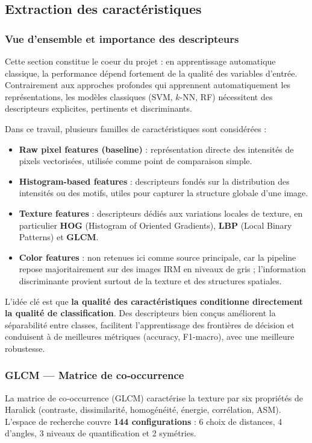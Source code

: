 \documentclass[12pt,a4paper]{article}
\newcommand{\brun}[1]{\textcolor{BlueNum}{\textbf{#1}}} %
\begin{document}
        \subsection{Extraction des caractéristiques}

        \subsubsection{Vue d'ensemble et importance des descripteurs}
            Cette section constitue le coeur du projet : en apprentissage automatique classique, la performance dépend fortement de la qualité des variables d'entrée.
            Contrairement aux approches profondes qui apprennent automatiquement les représentations, les modèles classiques (SVM, \(k\)-NN, RF) nécessitent des descripteurs explicites, pertinents et discriminants.

            Dans ce travail, plusieurs familles de caractéristiques sont considérées :
            \begin{itemize}
            \item \textbf{Raw pixel features (baseline)} : représentation directe des intensités de pixels vectorisées, utilisée comme point de comparaison simple.
            \item \textbf{Histogram-based features} : descripteurs fondés sur la distribution des intensités ou des motifs, utiles pour capturer la structure globale d'une image.
            \item \textbf{Texture features} : descripteurs dédiés aux variations locales de texture, en particulier \textbf{HOG} (Histogram of Oriented Gradients), \textbf{LBP} (Local Binary Patterns) et \textbf{GLCM}.
            \item \textbf{Color features} : non retenues ici comme source principale, car la pipeline repose majoritairement sur des images IRM en niveaux de gris ; l'information discriminante provient surtout de la texture et des structures spatiales.
            \end{itemize}

            L'idée clé est que \textbf{la qualité des caractéristiques conditionne directement la qualité de classification}.
            Des descripteurs bien conçus améliorent la séparabilité entre classes, facilitent l'apprentissage des frontières de décision et conduisent à de meilleures métriques (accuracy, F1-macro), avec une meilleure robustesse.



            \subsubsection{GLCM — Matrice de co‑occurrence}
        La matrice de co‑occurrence (GLCM) caractérise la texture par six propriétés de Haralick (contraste, dissimilarité, homogénéité, énergie, corrélation, ASM). 
        L’espace de recherche couvre \brun{144 configurations} : 6 choix de distances, 4 d’angles, 3 niveaux de quantification et 2 symétries.
\end{document}
